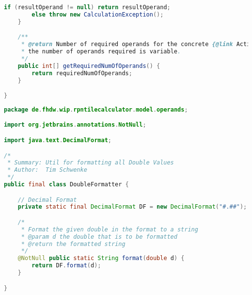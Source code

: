 \begin{lstlisting}[caption=DoubleComparator (Schwenke),label=list:DoubleComparator,language=Java]
        if (resultOperand != null) return resultOperand;
        else throw new CalculationException();
    }

    /**
     * @return Number of required operands for the concrete {@link Action}. If {@code -1}
     * the number of operands required is variable.
     */
    public int[] getRequiredNumOfOperands() {
        return requiredNumOfOperands;
    }

}
\end{lstlisting}    

\begin{lstlisting}[caption=DoubleFormatter (Schwenke),label=list:DoubleFormatter,language=Java]
package de.fhdw.wip.rpntilecalculator.model.operands;

import org.jetbrains.annotations.NotNull;

import java.text.DecimalFormat;

/*
 * Summary: Util for formatting all Double Values
 * Author:  Tim Schwenke
 */
public final class DoubleFormatter {

    // Decimal Format
    private static final DecimalFormat DF = new DecimalFormat("#.##");

    /*
     * Format the given double in the format to a string
     * @param d the double that is to be formatted
     * @return the formatted string
     */
    @NotNull public static String format(double d) {
        return DF.format(d);
    }

}

\end{lstlisting} 

